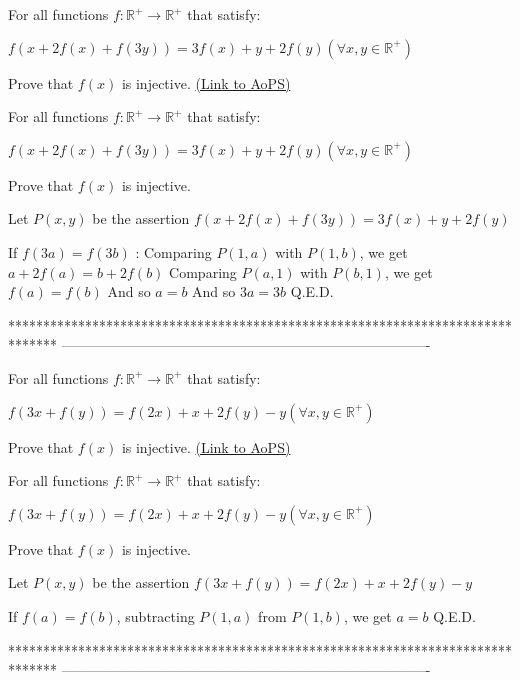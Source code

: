 \begin{problem}
	For all functions $f:\mathbb{R}^{+} \to \mathbb{R}^{+}$ that satisfy:

$f(x+2f(x)+f(3y))=3f(x)+y+2f(y) (\forall x,y \in \mathbb{R}^{+})$

Prove that $f(x)$ is injective.
	\flushright \href{https://artofproblemsolving.com/community/c6h1620555}{(Link to AoPS)}
\end{problem}



\begin{solution}
	\begin{tcolorbox}For all functions $f:\mathbb{R}^{+} \to \mathbb{R}^{+}$ that satisfy:

$f(x+2f(x)+f(3y))=3f(x)+y+2f(y) (\forall x,y \in \mathbb{R}^{+})$

Prove that $f(x)$ is injective.\end{tcolorbox}
Let $P(x,y)$ be the assertion $f(x+2f(x)+f(3y))=3f(x)+y+2f(y)$

If $f(3a)=f(3b)$ :
Comparing $P(1,a)$ with $P(1,b)$, we get $a+2f(a)=b+2f(b)$
Comparing $P(a,1)$ with $P(b,1)$, we get $f(a)=f(b)$
And so $a=b$
And so $3a=3b$
Q.E.D.


\end{solution}
*******************************************************************************
-------------------------------------------------------------------------------

\begin{problem}
	For all functions $f:\mathbb{R}^{+} \to \mathbb{R}^{+}$ that satisfy:

$f(3x+f(y))=f(2x)+x+2f(y)-y (\forall x,y \in \mathbb{R}^{+})$

Prove that $f(x)$ is injective.
	\flushright \href{https://artofproblemsolving.com/community/c6h1620556}{(Link to AoPS)}
\end{problem}



\begin{solution}
	\begin{tcolorbox}For all functions $f:\mathbb{R}^{+} \to \mathbb{R}^{+}$ that satisfy:

$f(3x+f(y))=f(2x)+x+2f(y)-y (\forall x,y \in \mathbb{R}^{+})$

Prove that $f(x)$ is injective.\end{tcolorbox}
Let $P(x,y)$ be the assertion $f(3x+f(y))=f(2x)+x+2f(y)-y$

If $f(a)=f(b)$, subtracting $P(1,a)$ from $P(1,b)$, we get $a=b$
Q.E.D.


\end{solution}
*******************************************************************************
-------------------------------------------------------------------------------

